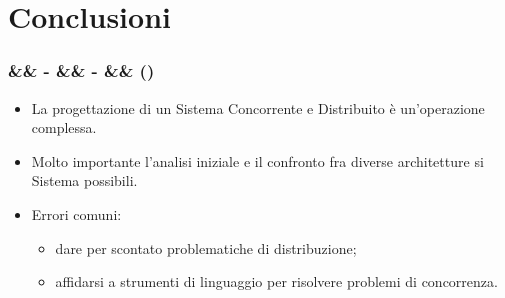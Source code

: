 \documentclass[slidestop,compress,blackandwhite]{beamer}
\newcommand{\cm}[1]{\vspace{#1cm}}
\newcommand{\newtitle}[4]{
	#1 
	\ifx&#2&%
	\else
  		\large- #2
	\fi
	\ifx&#3&%
	\else
  		\normalsize- #3
	\fi
	\ifx&#4&%
	\else
  		\normalsize (#4)
	\fi
}
\newcommand{\newframe}[5]{
	\begin{frame}
		\frametitle{\newtitle{#1}{#2}{#3}{#4}}
		#5
	\end{frame}
}
\newcommand{\myitemize}[1]{
	\begin{itemize}\itemsep4pt
	#1
	\end{itemize}
}
\begin{document}
\section{Conclusioni}\label{conclusions}
	
	\newframe{}{}{}{}{
		\cm{0.5}
		\myitemize {
			\item La progettazione di un Sistema Concorrente e Distribuito è un'operazione complessa.
			\item Molto importante l'analisi iniziale e il confronto fra diverse architetture si Sistema possibili.
			\item Errori comuni:
				\myitemize {
					\item dare per scontato problematiche di distribuzione;
					\item affidarsi a strumenti di linguaggio per risolvere problemi di concorrenza.
				}
		}
	}
	
\end{document}
